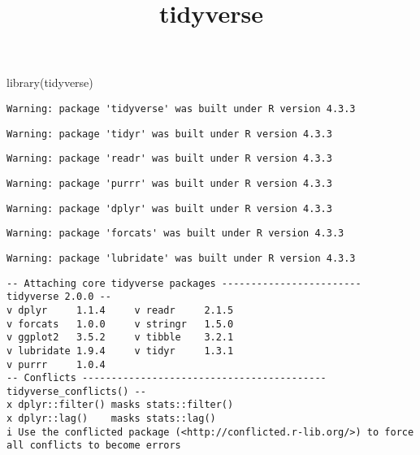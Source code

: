 \documentclass[
  letterpaper,
  DIV=11,
  numbers=noendperiod]{scrartcl}
\title{tidyverse}
\author{}
\date{}
\newenvironment{Shaded}{\begin{snugshade}}{\end{snugshade}}
\newcommand{\FunctionTok}[1]{\textcolor[rgb]{0.28,0.35,0.67}{#1}}
\newcommand{\NormalTok}[1]{\textcolor[rgb]{0.00,0.23,0.31}{#1}}
\begin{document}
\maketitle


\begin{Shaded}
\begin{Highlighting}[]
\FunctionTok{library}\NormalTok{(tidyverse)}
\end{Highlighting}
\end{Shaded}

\begin{verbatim}
Warning: package 'tidyverse' was built under R version 4.3.3
\end{verbatim}

\begin{verbatim}
Warning: package 'tidyr' was built under R version 4.3.3
\end{verbatim}

\begin{verbatim}
Warning: package 'readr' was built under R version 4.3.3
\end{verbatim}

\begin{verbatim}
Warning: package 'purrr' was built under R version 4.3.3
\end{verbatim}

\begin{verbatim}
Warning: package 'dplyr' was built under R version 4.3.3
\end{verbatim}

\begin{verbatim}
Warning: package 'forcats' was built under R version 4.3.3
\end{verbatim}

\begin{verbatim}
Warning: package 'lubridate' was built under R version 4.3.3
\end{verbatim}

\begin{verbatim}
-- Attaching core tidyverse packages ------------------------ tidyverse 2.0.0 --
v dplyr     1.1.4     v readr     2.1.5
v forcats   1.0.0     v stringr   1.5.0
v ggplot2   3.5.2     v tibble    3.2.1
v lubridate 1.9.4     v tidyr     1.3.1
v purrr     1.0.4     
-- Conflicts ------------------------------------------ tidyverse_conflicts() --
x dplyr::filter() masks stats::filter()
x dplyr::lag()    masks stats::lag()
i Use the conflicted package (<http://conflicted.r-lib.org/>) to force all conflicts to become errors
\end{verbatim}
\end{document}
